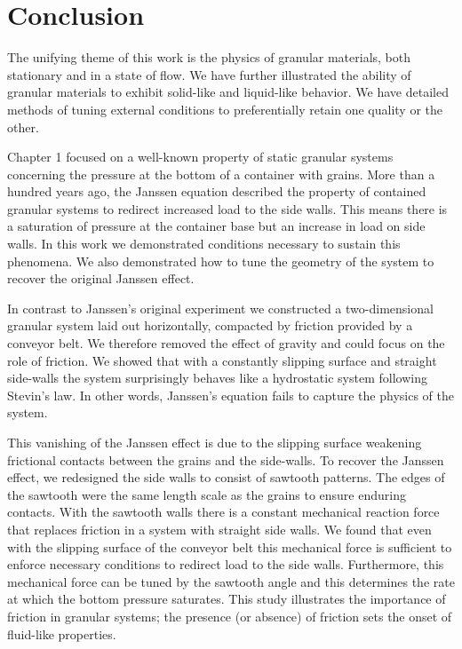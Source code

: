 \chapter{Conclusion}

The unifying theme of this work is the physics of granular materials, both stationary and in a state of flow. We have further illustrated the ability of granular materials to exhibit solid-like and liquid-like behavior. We have detailed methods of tuning external conditions to preferentially retain one quality or the other. 

Chapter 1 focused on a well-known property of static granular systems concerning the pressure at the bottom of a container with grains. More than a hundred years ago, the Janssen equation described the property of contained granular systems to redirect increased load to the side walls. This means there is a saturation of pressure at the container base but an increase in load on side walls. In this work we demonstrated conditions necessary to sustain this phenomena. We also demonstrated how to tune the geometry of the system to recover the original Janssen effect. 

In contrast to Janssen's original experiment we constructed a two-dimensional granular system laid out horizontally, compacted by friction provided by a conveyor belt. We therefore removed the effect of gravity and could focus on the role of friction. We showed that with a constantly slipping surface and straight side-walls the system surprisingly behaves like a hydrostatic system following Stevin's law. In other words, Janssen's equation fails to capture the physics of the system. 

This vanishing of the Janssen effect is due to the slipping surface weakening frictional contacts between the grains and the side-walls. To recover the Janssen effect, we redesigned the side walls to consist of sawtooth patterns. The edges of the sawtooth were the same length scale as the grains to ensure enduring contacts. With the sawtooth walls there is a constant mechanical reaction force that replaces friction in a system with straight side walls. We found that even with the slipping surface of the conveyor belt this mechanical force is sufficient to enforce necessary conditions to redirect load to the side walls. Furthermore, this mechanical force can be tuned by the sawtooth angle and this determines the rate at which the bottom pressure saturates. This study illustrates the importance of friction in granular systems; the presence (or absence) of friction sets the onset of fluid-like properties. 

